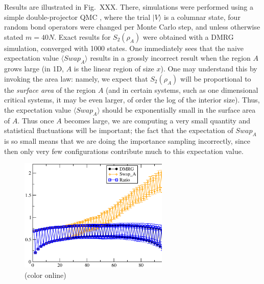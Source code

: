 \documentclass[prl,aps,twocolumn,floatfix,amsmath,amssymb,superscriptaddress,tightenlines]{revtex4}
\begin{document}
Results are illustrated in Fig.~XXX.  There, simulations were performed using a simple double-projector QMC \cite{Sandvik}, where
the trial $| V \rangle$ is a columnar state, four random bond operators were changed per Monte Carlo step, and unless otherwise
stated $m=40N$.  Exact results for $S_2(\rho_A)$ were obtained with a DMRG simulation, converged with 1000 states.  One 
immediately sees that the naive expectation value $\langle Swap_A \rangle$ results in a grossly incorrect result when the region
$A$ grows large (in 1D, $A$ is the linear region of size $x$).   
One may understand this by invoking the area law: namely,
we expect
that $S_2(\rho_A)$ will be proportional to the {\it surface area} of the region
$A$ (and in certain systems, such as one dimensional critical systems, it
may be even larger, of order the log of the interior size).  Thus,
the expectation value $\langle Swap_A \rangle$ should be exponentially small in the
surface area of $A$.  Thus once $A$ becomes
large, we are computing a very small quantity and
statistical fluctuations will be important;
the fact that the expectation
of $Swap_A$ is so small means that we are doing the importance sampling
incorrectly, since then only very few configurations contribute much to this
expectation value.

\begin{figure} {
\includegraphics[width=2.8in]{fig2.eps} \caption{(color online) 
\label{1Dfig}
}
} \end{figure}
\end{document}
